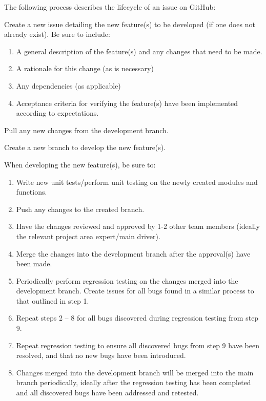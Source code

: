 \documentclass{article}
\begin{document}
\noindent The following process describes the lifecycle of an issue on GitHub:

\begin{enumerate}
\begin{item}
Create a new issue detailing the new feature(s) to be developed (if one does not already exist). Be sure to include:
\begin{enumerate}
\item A general description of the feature(s) and any changes that need to be made.
\item A rationale for this change (as is necessary)
\item Any dependencies (as applicable)
\item Acceptance criteria for verifying the feature(s) have been implemented according to expectations.
\end{enumerate}
\end{item}
\begin{item}
Pull any new changes from the development branch.
\end{item}
\begin{item}
Create a new branch to develop the new feature(s).
\end{item}
\begin{item}
When developing the new feature(s), be sure to:
\begin{enumerate}
\item Write new unit tests/perform unit testing on the newly created modules and functions.
\item Push any changes to the created branch.
\item Have the changes reviewed and approved by 1-2 other team members (ideally the relevant project area expert/main driver).
\item Merge the changes into the development branch after the approval(s) have been made.
\item Periodically perform regression testing on the changes merged into the development branch. Create issues for all bugs found in a similar process to that outlined in step 1.
\item Repeat steps 2 – 8 for all bugs discovered during regression testing from step 9.
\item Repeat regression testing to ensure all discovered bugs from step 9 have been resolved, and that no new bugs have been introduced.
\item Changes merged into the development branch will be merged into the main branch periodically, ideally after the regression testing has been completed and all discovered bugs have been addressed and retested.
\end{enumerate}
\end{item}
\end{enumerate}
 
\end{document}

